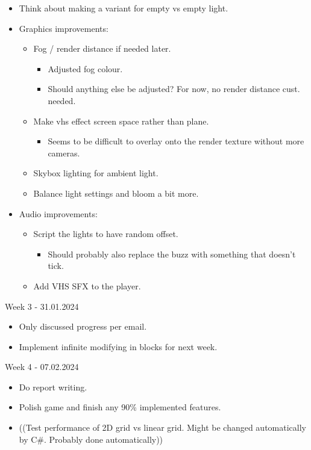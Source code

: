 \begin{itemize}
\begin{itemize}
        \item Think about making a variant for empty vs empty light.
        \item Graphics improvements:
        \begin{itemize}
            \item Fog / render distance if needed later.
            \begin{itemize}
                \item Adjusted fog colour.
                \item Should anything else be adjusted? For now, no render distance cust. needed.
            \end{itemize}
            \item Make vhs effect screen space rather than plane.
            \begin{itemize}
                \item Seems to be difficult to overlay onto the render texture without more cameras.
            \end{itemize}
            \item Skybox lighting for ambient light.
            \item Balance light settings and bloom a bit more.
        \end{itemize}
        \item Audio improvements:
        \begin{itemize}
            \item Script the lights to have random offset.
            \begin{itemize}
                \item Should probably also replace the buzz with something that doesn’t tick.
            \end{itemize}
            \item Add VHS SFX to the player.
        \end{itemize}
    \end{itemize}
\end{itemize}

\noindent Week 3 - 31.01.2024
\begin{itemize}
    \item Only discussed progress per email.
    \item Implement infinite modifying in blocks for next week.
\end{itemize}

\noindent Week 4 - 07.02.2024
\begin{itemize}
    \item Do report writing.
    \item Polish game and finish any 90\% implemented features.
    \item ((Test performance of 2D grid vs linear grid. Might be changed automatically by C\#. Probably done automatically))
\end{itemize}

